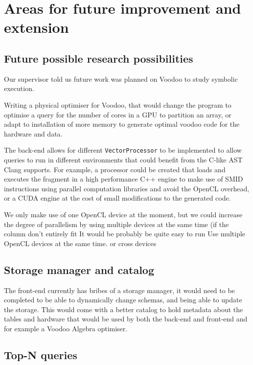 \section{Areas for future improvement and extension}

\subsection{Future possible research possibilities}

Our supervisor told us future work was planned on Voodoo to study symbolic execution.

Writing a physical optimiser for Voodoo, that would change the program to optimise a query for the number of cores in a GPU to partition an array, or adapt to installation of more memory to generate optimal voodoo code for the hardware and data.

The back-end allows for different \texttt{VectorProcessor} to be implemented to allow queries to run in different environments that could benefit from the C-like AST Clang supports. For example, a processor could be created that loads and executes the fragment in a high performance C++ engine to make use of SMID instructions using parallel computation libraries and avoid the OpenCL overhead, or a CUDA engine at the cost of small modifications to the generated code.

We only make use of one OpenCL device at the moment, but we could increase the degree of parallelism by using multiple devices at the same time (if the column don't entirely fit It would be probably be quite easy to run Use multiple OpenCL devices at the same time. or cross devices

\subsection{Storage manager and catalog}

The front-end currently has bribes of a storage manager, it would need to be completed to be able to dynamically change schemas, and being able to update the storage. This would come with a better catalog to hold metadata about the tables and hardware that would be used by both the back-end and front-end and for example a Voodoo Algebra optimiser.

\subsection{Top-N queries}
\label{sub:top-n}

